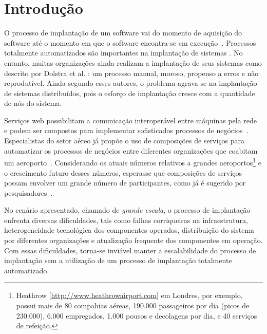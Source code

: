\chapter{Introdução}
\label{cap:introducao}

O processo de implantação de um software vai do momento de aquisição do software até o momento em que o software encontra-se em execução~\cite{DEPL2006}. Processos totalmente automatizados são importantes na implantação de sistemas \cite{Humble2011Continuous}. No entanto, muitas organizações ainda realizam a implantação de seus sistemas como descrito por Dolstra et al. \cite{Dolstra2005Configuration}: um processo manual, moroso, propenso a erros e não reprodutível. Ainda segundo esses autores, o problema agrava-se na implantação de sistemas distribuídos, pois o esforço de implantação cresce com a quantidade de nós do sistema. 

Serviços web possibilitam a comunicação interoperável entre máquinas pela rede~\cite{W3C2004WS}
e podem ser compostos para implementar sofisticados processos de negócios~\cite{Papazoglou2007State}.
Especialistas do setor aéreo já propõe o uso de composições de serviços
para automatizar os processos de negócios entre diferentes organizações
que coabitam um aeroporto~\cite{Choreos2012D6.2}.
Considerando os atuais números relativos a grandes
aeroportos\footnote{Heathrow [\url{http://www.heathrowairport.com}] em Londres, por exemplo, 
possui mais de 80 compahias aéreas, 190.000 passageiros por dia (picos de 230.000),
6.000 empregados, 1.000 pousos e decolagens por dia, e 40 serviços de refeição.}
e o crescimento futuro desses números, esperasse que
composições de serviços possam envolver um grande número de participantes,
como já é sugerido por pesquisadores~\cite{Valerie2011FutureInternet}.

No cenário apresentado, chamado de \emph{grande escala},
o processo de implantação enfrenta diversas dificuldades, 
tais como falhas corriqueiras na infraestrutura, 
heterogeneidade tecnológica dos componentes operados, 
distribuição do sistema por diferentes organizações
e atualização frequente dos componentes em operação.
Com essas dificuldades, torna-se inviável manter a escalabilidade do processo de implantação
sem a utilização de um processo de implantação totalmente automatizado.

